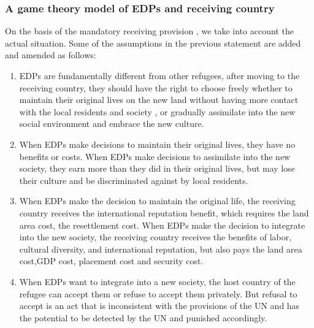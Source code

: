 \documentclass{mcmthesis}
\begin{document}
\subsubsection{A game theory model of EDPs and receiving country}
\quad\enspace On the basis of the mandatory receiving provision , we take into account the actual situation. Some of the assumptions in the previous statement are added and amended as follows:
\begin{enumerate}
\item EDPs are fundamentally different from other refugees, after moving to the receiving country, they should have the right to choose freely whether to maintain their original lives on the new land without having more contact with the local residents and society , or  gradually assimilate into the new social environment and embrace the new culture. 

\item When EDPs make decisions to maintain their original lives, they have no benefits or costs. When EDPs make decisions to assimilate into the new society, they earn more than they did in their original lives, but may lose their culture and be discriminated against by local residents. 

\item When EDPs make the decision to maintain the original life, the receiving country receives the international reputation benefit, which requires the land area cost, the resettlement cost. When EDPs make the decision to integrate into the new society, the receiving country receives the benefits of labor, cultural diversity, and international reputation, but also pays the land area cost,GDP cost, placement cost and security cost. 

\item When EDPs want to integrate into a new society, the host country of the refugee can accept them or refuse to accept them privately. But refusal to accept is an act that is inconsistent with the provisions of the UN and has the potential to be detected by the UN and punished accordingly. 
\end{enumerate}
\end{document}
